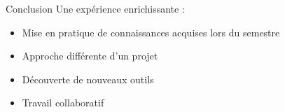 \begin{frame}{Conclusion}
	Une expérience enrichissante :
		\begin{itemize}
			\item Mise en pratique de connaissances acquises lors du semestre
			\item Approche différente d'un projet
			\item Découverte de nouveaux outils
			\item Travail collaboratif
		\end{itemize}
\end{frame}